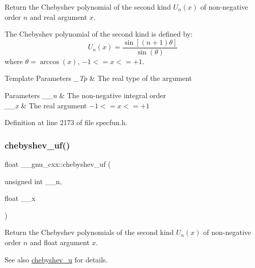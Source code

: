 Return the Chebyshev polynomial of the second kind $ U_n(x) $ of non-\/negative order $ n $ and real argument $ x $.

The Chebyshev polynomial of the second kind is defined by\+: \[ U_n(x) = \frac{\sin \left[(n+1)\theta \right]}{\sin(\theta)} \] where $ \theta = \arccos(x) $, $ -1 <= x <= +1 $.


\begin{DoxyTemplParams}{Template Parameters}
{\em \+\_\+\+Tp} & The real type of the argument \\
\hline
\end{DoxyTemplParams}

\begin{DoxyParams}{Parameters}
{\em \+\_\+\+\_\+n} & The non-\/negative integral order \\
\hline
{\em \+\_\+\+\_\+x} & The real argument $ -1 <= x <= +1 $ \\
\hline
\end{DoxyParams}


Definition at line 2173 of file specfun.\+h.

\mbox{\label{group__gnu__math__spec__func_ga4b28c2a079eae2e9612c9902801ca256}} 
\subsubsection{\texorpdfstring{chebyshev\+\_\+uf()}{chebyshev\_uf()}}
{\footnotesize\ttfamily float \+\_\+\+\_\+gnu\+\_\+cxx\+::chebyshev\+\_\+uf (\begin{DoxyParamCaption}\item[{unsigned int}]{\+\_\+\+\_\+n,  }\item[{float}]{\+\_\+\+\_\+x }\end{DoxyParamCaption})\hspace{0.3cm}{\ttfamily [inline]}}

Return the Chebyshev polynomials of the second kind $ U_n(x) $ of non-\/negative order $ n $ and {\ttfamily float} argument $ x $.

\begin{DoxySeeAlso}{See also}
\hyperlink{group__gnu__math__spec__func_gafa90c06bdedb8459f20576297cf1608f}{chebyshev\+\_\+u} for details. 
\end{DoxySeeAlso}


